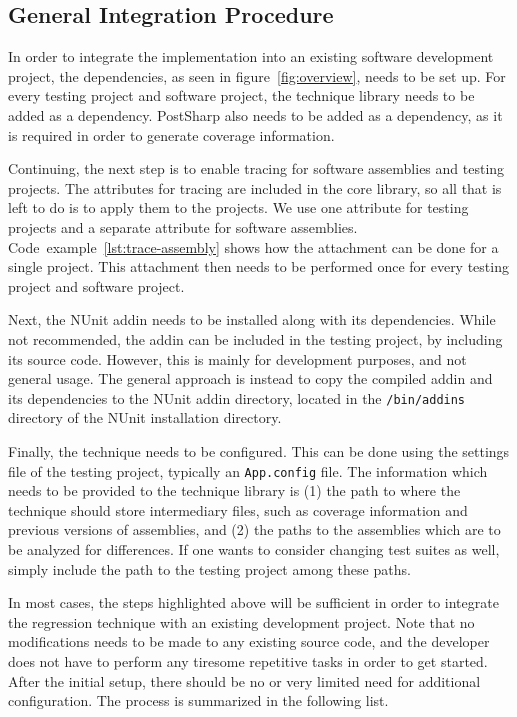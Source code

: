 \documentclass[a4paper,english,12pt]{report}
\newcommand{\textcf}{\texttt}
\begin{document}
\subsection{General Integration Procedure}
In order to integrate the implementation into an existing software development project, the dependencies, as seen in figure~\vref{fig:overview}, needs to be set up. For every testing project and software project, the technique library needs to be added as a dependency. PostSharp also needs to be added as a dependency, as it is required in order to generate coverage information.

Continuing, the next step is to enable tracing for software assemblies and testing projects. The attributes for tracing are included in the core library, so all that is left to do is to apply them to the projects. We use one attribute for testing projects and a separate attribute for software assemblies. Code~example~\vref{lst:trace-assembly} shows how the attachment can be done for a single project. This attachment then needs to be performed once for every testing project and software project.

Next, the NUnit addin needs to be installed along with its dependencies. While not recommended, the addin can be included in the testing project, by including its source code. However, this is mainly for development purposes, and not general usage. The general approach is instead to copy the compiled addin and its dependencies to the NUnit addin directory, located in the \textcf{/bin/addins} directory of the NUnit installation directory.

Finally, the technique needs to be configured. This can be done using the settings file of the testing project, typically an \textcf{App.config} file. The information which needs to be provided to the technique library is (1) the path to where the technique should store intermediary files, such as coverage information and previous versions of assemblies, and (2) the paths to the assemblies which are to be analyzed for differences. If one wants to consider changing test suites as well, simply include the path to the testing project among these paths.

In most cases, the steps highlighted above will be sufficient in order to integrate the regression technique with an existing development project. Note that no modifications needs to be made to any existing source code, and the developer does not have to perform any tiresome repetitive tasks in order to get started. After the initial setup, there should be no or very limited need for additional configuration. The process is summarized in the following list.
\end{document}
